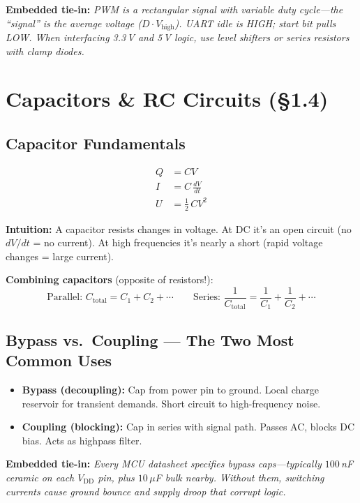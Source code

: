 \documentclass[11pt,a4paper]{article}
\newcommand{\intuition}[1]{\par\textcolor{intuition}{\textbf{Intuition:}} #1}
\newcommand{\embedded}[1]{\par\textcolor{embed}{\textbf{Embedded tie-in:}} \textit{#1}}
\begin{document}
\embedded{PWM is a rectangular signal with variable duty cycle---the ``signal'' is the average voltage ($D \cdot V_{\text{high}}$). UART idle is HIGH; start bit pulls LOW. When interfacing 3.3\,V and 5\,V logic, use level shifters or series resistors with clamp diodes.}

\section{Capacitors \& RC Circuits (\S1.4)}

\subsection{Capacitor Fundamentals}

\begin{align}
Q &= CV \tag{charge stored} \\
I &= C\,\frac{dV}{dt} \tag{current $\propto$ rate of voltage change} \\
U &= \tfrac{1}{2}\,CV^2 \tag{stored energy}
\end{align}

\intuition{A capacitor resists changes in voltage. At DC it's an open circuit (no $dV/dt$ = no current). At high frequencies it's nearly a short (rapid voltage changes = large current).}

\textbf{Combining capacitors} (opposite of resistors!):
\[
\text{Parallel: } C_{\text{total}} = C_1 + C_2 + \cdots \qquad
\text{Series: } \frac{1}{C_{\text{total}}} = \frac{1}{C_1} + \frac{1}{C_2} + \cdots
\]

\subsection{Bypass vs.\ Coupling --- The Two Most Common Uses}

\begin{itemize}[nosep]
\item \textbf{Bypass (decoupling):} Cap from power pin to ground. Local charge reservoir for transient demands. Short circuit to high-frequency noise.
\item \textbf{Coupling (blocking):} Cap in series with signal path. Passes AC, blocks DC bias. Acts as highpass filter.
\end{itemize}

\embedded{Every MCU datasheet specifies bypass caps---typically $100\,$nF ceramic on each $V_{\text{DD}}$ pin, plus $10\,\mu$F bulk nearby. Without them, switching currents cause ground bounce and supply droop that corrupt logic.}
\end{document}
